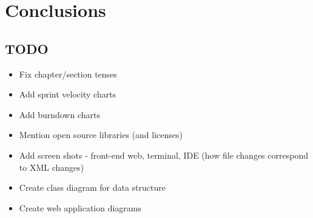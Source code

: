 \chapter{Conclusions}

\section{TODO}
\begin{itemize}
\item Fix chapter/section tenses
\item Add sprint velocity charts
\item Add burndown charts
\item Mention open source libraries (and licenses)
\item Add screen shots - front-end web, terminal, IDE (how file changes correspond to XML changes)
\item Create class diagram for data structure
\item Create web application diagrams
\end{itemize}
